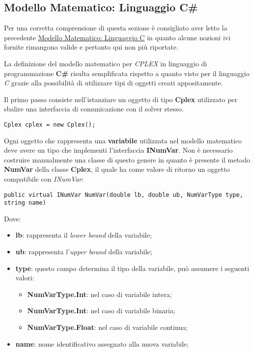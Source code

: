\documentclass[11pt]{article}
\begin{document}
\subsection*{Modello Matematico: Linguaggio C\#}
\label{sec:ModelloCSS}

Per una corretta comprensione di questa sezione è consigliato aver letto la precedente \hyperref[sec:ModelloCS]{Modello Matematico: Linguaggio C} in quanto alcune nozioni ivi fornite rimangono valide e pertanto qui non più riportate.

La definizione del modello matematico per \textit{CPLEX} in linguaggio di programmazione \textbf{C\#} risulta semplificata rispetto a quanto visto per il linguaggio \textit{C} grazie alla possibilità di utilizzare tipi di oggetti creati appositamente.

Il primo passo consiste nell'istanziare un oggetto di tipo \textbf{Cplex} utilizzato per sbalire una interfaccia di comunicazione con il solver stesso.

\begin{lstlisting}
Cplex cplex = new Cplex();
\end{lstlisting}

Ogni oggetto che rappresenta una \textbf{variabile} utilizzata nel modello matematico deve avere un tipo che implementi l'interfaccia \textbf{INumVar}. Non è necessario costruire manualmente una classe di questo genere in quanto è presente il metodo \textbf{NumVar} della classe \textbf{Cplex}, il quale ha come valore di ritorno un oggetto compatibile con \textit{INumVar}:

\begin{lstlisting}
public virtual INumVar NumVar(double lb, double ub, NumVarType type, string name)
\end{lstlisting}

Dove:

\begin{itemize}
\item \textbf{lb}: rappresenta il \textit{lower bound} della variabile;
\item \textbf{ub}: rappresenta l'\textit{upper bound} della variabile;
\item \textbf{type}: questo campo determina il tipo della variabile, può assumere i seguenti valori:
\begin{itemize}
\item \textbf{NumVarType.Int}: nel caso di variabile intera;
\item \textbf{NumVarType.Int}: nel caso di variabile binaria;
\item \textbf{NumVarType.Float}: nel caso di variabile continua;
\end{itemize}
\item \textbf{name}: nome identificativo assegnato alla nuova variabile;
\end{itemize}
\end{document}
